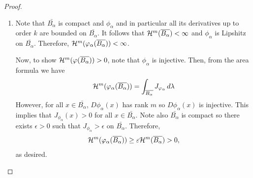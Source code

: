 \documentclass[a4paper]{article}
\begin{document}
\begin{proof}
\begin{enumerate}
    \item Note that $\bar{B_\alpha}$ is compact and $\phi_\alpha$ and in
          particular all its derivatives up to order $k$ are bounded on
          $\bar{B_\alpha}$. It follows that $\mathcal{H}^m (\overline{B_\alpha}) <
          \infty$ and $\phi_\alpha$ is Lipshitz on $\bar{B_\alpha}$.
          Therefore, $\mathcal{H}^m (\varphi_\alpha (\overline{B_\alpha})) < \infty$.

          Now, to show $\mathcal{H}^m (\varphi(\overline{B_\alpha})) > 0$, note that
          $\phi_\alpha$ is injective. Then, from the area formula we have
          \[
            \mathcal{H}^m (\varphi_\alpha (\overline{B_\alpha}))
            = \int_{\overline{B_\alpha}} J_{\varphi_\alpha} \, d \lambda
          \]
          However, for all $x \in \bar{B_\alpha}$, $D \phi_\alpha(x)$ has
          rank $m$ so $D \phi_\alpha(x)$ is injective. This implies that
          $J_{\phi_\alpha}(x) > 0$ for all $x \in \bar{B_\alpha}$. Note
          also $\bar{B_\alpha}$ is compact so there exists $\epsilon > 0$
          such that $J_{\phi_\alpha} > \epsilon$ on $\bar{B_\alpha}$.
          Therefore,
          \[
            \mathcal{H}^m (\varphi_\alpha(\overline{B_\alpha}))
            \geq \varepsilon \mathcal{H}^m (\overline{B_\alpha})
            > 0,
          \]
          as desired.
  \end{enumerate}
\end{proof}
\end{document}
